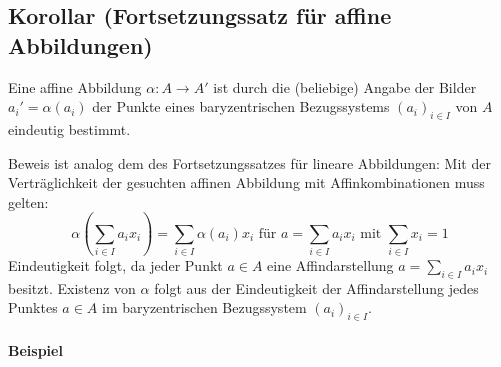  \subsection{Korollar (Fortsetzungssatz für affine Abbildungen)}
 	\begin{Korollar}
 		Eine affine Abbildung $ \alpha:A\to A' $ ist durch die (beliebige) Angabe der Bilder $ a_i' = \alpha(a_i) $ der Punkte eines baryzentrischen Bezugssystems $ (a_i)_{i\in I} $ von $ A $ eindeutig bestimmt.
 	\end{Korollar}
 	Beweis ist analog dem des Fortsetzungssatzes für lineare Abbildungen: Mit der Verträglichkeit der gesuchten affinen Abbildung mit Affinkombinationen muss gelten:
 	\[
 		\alpha\left(\sum_{i\in I}a_ix_i\right)=\sum_{i\in I}\alpha(a_i)x_i \text{ für } a =\sum_{i\in I}a_ix_i \text{ mit } \sum_{i\in I}x_i = 1
 	\]
 	Eindeutigkeit folgt, da jeder Punkt $ a\in A $ eine Affindarstellung $ a = \sum_{i\in I}a_ix_i $ besitzt. Existenz von $ \alpha $ folgt aus der Eindeutigkeit der Affindarstellung jedes Punktes $ a\in A $ im baryzentrischen Bezugssystem $ (a_i)_{i\in I} $.

 	\paragraph{Beispiel}

